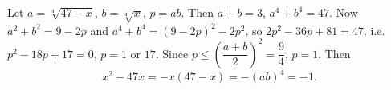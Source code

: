Let $a=\sqrt[4]{47-x}$, $b=\sqrt[4]x$, $p=ab$. Then $a+b=3$, $a^4+b^4=47$. Now $a^2+b^2=9-2p$ and $a^4+b^4=(9-2p)^2-2p^2$, so $2p^2-36p+81=47$, i.e. $p^2-18p+17=0$, $p=1$ or $17$. Since $p\le\left(\dfrac{a+b}{2}\right)^2=\dfrac{9}{4}$, $p=1$. Then
\[x^2-47x=-x(47-x)=-(ab)^4=\boxed{-1}.\]
